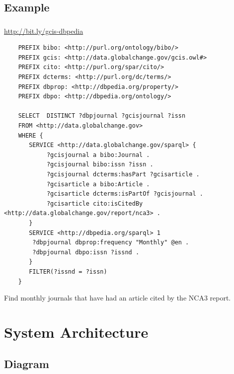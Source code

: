 \documentclass{beamer}
\begin{document}
\subsection{Example}
\begin{frame}[fragile]
    \frametitle{\insertsubsectionhead}
     \url{http://bit.ly/gcis-dbpedia}\\
\begin{tiny}
\begin{Verbatim}
    PREFIX bibo: <http://purl.org/ontology/bibo/>
    PREFIX gcis: <http://data.globalchange.gov/gcis.owl#>
    PREFIX cito: <http://purl.org/spar/cito/>
    PREFIX dcterms: <http://purl.org/dc/terms/>
    PREFIX dbprop: <http://dbpedia.org/property/>
    PREFIX dbpo: <http://dbpedia.org/ontology/>

    SELECT  DISTINCT ?dbpjournal ?gcisjournal ?issn
    FROM <http://data.globalchange.gov>
    WHERE {
       SERVICE <http://data.globalchange.gov/sparql> {
            ?gcisjournal a bibo:Journal .
            ?gcisjournal bibo:issn ?issn .
            ?gcisjournal dcterms:hasPart ?gcisarticle .
            ?gcisarticle a bibo:Article .
            ?gcisarticle dcterms:isPartOf ?gcisjournal .
            ?gcisarticle cito:isCitedBy <http://data.globalchange.gov/report/nca3> .
       }
       SERVICE <http://dbpedia.org/sparql> 1
        ?dbpjournal dbprop:frequency "Monthly" @en .
        ?dbpjournal dbpo:issn ?issnd .
       }
       FILTER(?issnd = ?issn)
    }
\end{Verbatim}
\end{tiny}
    Find monthly journals that have had an article cited by the NCA3 report.

\end{frame}

\section{System Architecture}

\subsection{Diagram}

\end{document}

